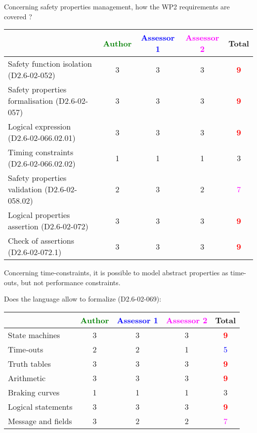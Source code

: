 Concerning safety properties management, how the WP2 requirements are covered ?

\begin{tabular}{|l | c | c | c | c|}
\hline
& \textcolor{green}{Author} & \textcolor{blue}{Assessor 1} & \textcolor{magenta}{Assessor 2} & Total \\
\hline 
Safety function isolation (D2.6-02-052)  & 3     & 3     & 3     & \textcolor{red}{\textbf{9}} \\
\hline 
Safety properties formalisation (D2.6-02-057)  & 3     & 3     & 3     & \textcolor{red}{\textbf{9}} \\
\hline
Logical expression (D2.6-02-066.02.01)  & 3     & 3     & 3     & \textcolor{red}{\textbf{9}} \\
\hline
Timing constraints (D2.6-02-066.02.02)  & 1     & 1     & 1     & 3     \\
\hline
Safety properties validation (D2.6-02-058.02)  & 2     & 3     & 2     & \textcolor{magenta}{7} \\
\hline
Logical properties assertion (D2.6-02-072)  & 3     & 3     & 3     & \textcolor{red}{\textbf{9}} \\
\hline
Check  of assertions (D2.6-02-072.1)  & 3     & 3     & 3     & \textcolor{red}{\textbf{9}} \\
\hline
\end{tabular}


\begin{author_comment}
Concerning time-constraints, it is possible to  model  abstract properties as time-outs, but not performance constraints.
\end{author_comment}


Does the language allow to  formalize (D2.6-02-069):

\begin{tabular}{|l | c | c | c | c|}
\hline
& \textcolor{green}{Author} & \textcolor{blue}{Assessor 1} & \textcolor{magenta}{Assessor 2} & Total \\
\hline 
State machines  & 3     & 3     & 3     & \textcolor{red}{\textbf{9}} \\
\hline
Time-outs  & 2     & 2     & 1     & \textcolor{blue}{5} \\
\hline
Truth tables  & 3     & 3     & 3     & \textcolor{red}{\textbf{9}} \\
\hline
Arithmetic  & 3     & 3     & 3     & \textcolor{red}{\textbf{9}} \\
\hline
Braking curves  & 1     & 1     & 1     & 3     \\
\hline
Logical statements & 3     & 3     & 3     & \textcolor{red}{\textbf{9}} \\
\hline
Message and fields & 3     & 2     & 2     & \textcolor{magenta}{7} \\
\hline
\end{tabular}

